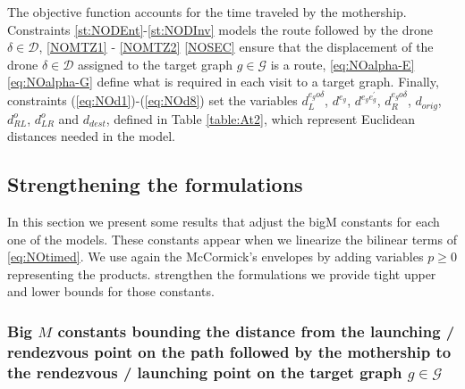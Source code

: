 \noindent
The objective function accounts for the time traveled by the mothership. Constraints \eqref{st:NODEnt}-\eqref{st:NODInv} models the route followed by the drone $\delta\in\mathcal D$, \eqref{NOMTZ1} - \eqref{NOMTZ2}  \eqref{NOSEC} ensure that the displacement of the drone $\delta\in\mathcal D$ assigned to the target graph $g\in\mathcal G$ is a route, \eqref{eq:NOalpha-E}  \eqref{eq:NOalpha-G} define what is required in each visit to a target graph. Finally, constraints (\ref{eq:NOd1})-(\ref{eq:NOd8}) set the variables $d_L^{e_go\delta}$, $d^{e_g}$, $d^{e_ge^\prime_g}$, $d_R^{e_go\delta}$, $d_{orig}$, $d_{RL}^o$, $d_{LR}^o$ and $d_{dest}$, defined in Table \ref{table:At2}, which represent Euclidean distances needed in the model. \\

\subsection*{Strengthening the formulations}
\noindent
In this section\RE{,} we present some results that adjust the bigM constants for each one of the models. These constants appear when we linearize the bilinear terms of \eqref{eq:NOtimed}. We use again the McCormick's envelopes by adding variables $p\geq 0$  representing the products.  strengthen the formulations\RE{,} we provide tight upper and lower bounds for those constants.  




\subsubsection*{Big $M$ constants bounding the distance from the launching / rendezvous point on the path followed by the mothership to the rendezvous / launching point on the target graph $g\in \mathcal{G}$}

